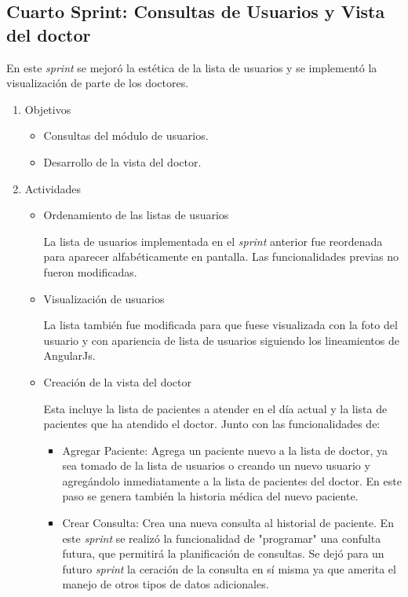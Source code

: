         
    \subsection{Cuarto Sprint: Consultas de Usuarios y Vista del doctor}
    
    En este \textit{sprint} se mejoró la estética de la lista de usuarios y se implementó la visualización de parte de los doctores.
    
    \begin{enumerate}
        \item Objetivos
        \begin{itemize}
            \item Consultas del módulo de usuarios.
            \item Desarrollo de la vista del doctor.
        \end{itemize}
        \item Actividades
        \begin{itemize}
            \item Ordenamiento de las listas de usuarios
            
            La lista de usuarios implementada en el \textit{sprint} anterior fue reordenada para aparecer alfabéticamente en pantalla. Las funcionalidades previas no fueron modificadas.
            
            \item Visualización de usuarios
            
            La lista también fue modificada para que fuese visualizada con la foto del usuario y con apariencia de lista de usuarios siguiendo los lineamientos de AngularJs.
            
            \item Creación de la vista del doctor
            
            Esta incluye la lista de pacientes a atender en el día actual y la lista de pacientes que ha atendido el doctor. Junto con las funcionalidades de:
            
            \begin{itemize}
                \item Agregar Paciente: Agrega un paciente nuevo a la lista de doctor, ya sea tomado de la lista de usuarios o creando un nuevo usuario y agregándolo inmediatamente a la lista de pacientes del doctor. En este paso se genera también la historia médica del nuevo paciente.
                
                \item Crear Consulta: Crea una nueva consulta al historial de paciente. En este \textit{sprint} se realizó la funcionalidad de "programar" una confulta futura, que permitirá la planificación de consultas. Se dejó para un futuro \textit{sprint} la ceración de la consulta en sí misma ya que amerita el manejo de otros tipos de datos adicionales.
            \end{itemize}
            

\end{itemize}
\end{enumerate}
